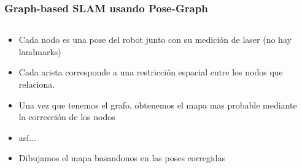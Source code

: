 \begin{frame}
    \frametitle{Graph-based SLAM usando Pose-Graph}
    
    \begin{columns}
        \begin{column}{0.5\textwidth}
        \begin{itemize}
            \item<1-2> Cada nodo es una pose del robot junto con su medición de laser (no hay landmarks)
            \item<1-2> Cada arista corresponde a una restricción espacial entre los nodos que relaciona.
            \item<3-> Una vez que tenemos el grafo, obtenemos el mapa mas probable mediante la corrección de los nodos
            \item<4-> así...
            \item<5> Dibujamos el mapa basandonos en las poses corregidas
        \end{itemize}
        \end{column}
        \begin{column}{0.5\textwidth}  %

\end{column}
\end{columns}
\end{frame}
